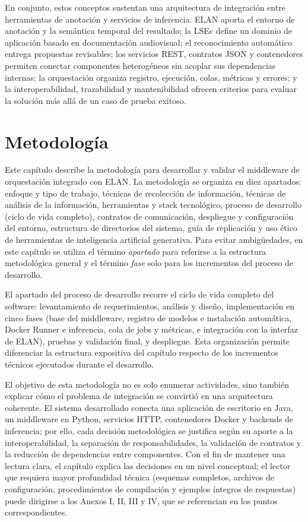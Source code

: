 \documentclass[11pt,a4paper]{article}
\begin{document}
En conjunto, estos conceptos sustentan una arquitectura de integración entre herramientas de anotación y servicios de inferencia. ELAN aporta el entorno de anotación y la semántica temporal del resultado; la LSEc define un dominio de aplicación basado en documentación audiovisual; el reconocimiento automático entrega propuestas revisables; los servicios REST, contratos JSON y contenedores permiten conectar componentes heterogéneos sin acoplar sus dependencias internas; la orquestación organiza registro, ejecución, colas, métricas y errores; y la interoperabilidad, trazabilidad y mantenibilidad ofrecen criterios para evaluar la solución más allá de un caso de prueba exitoso.
\vspace{1\baselineskip}

\section[METODOLOGÍA]{Metodología}

Este capítulo describe la metodología para desarrollar y validar el middleware de orquestación integrado con ELAN. La metodología se organiza en diez apartados: enfoque y tipo de trabajo, técnicas de recolección de información, técnicas de análisis de la información, herramientas y stack tecnológico, proceso de desarrollo (ciclo de vida completo), contratos de comunicación, despliegue y configuración del entorno, estructura de directorios del sistema, guía de replicación y uso ético de herramientas de inteligencia artificial generativa. Para evitar ambigüedades, en este capítulo se utiliza el término \textit{apartado} para referirse a la estructura metodológica general y el término \textit{fase} solo para los incrementos del proceso de desarrollo.

El apartado del proceso de desarrollo recorre el ciclo de vida completo del software: levantamiento de requerimientos, análisis y diseño, implementación en cinco fases (base del middleware, registro de modelos e instalación automática, Docker Runner e inferencia, cola de jobs y métricas, e integración con la interfaz de ELAN), pruebas y validación final, y despliegue. Esta organización permite diferenciar la estructura expositiva del capítulo respecto de los incrementos técnicos ejecutados durante el desarrollo.

El objetivo de esta metodología no es solo enumerar actividades, sino también explicar cómo el problema de integración se convirtió en una arquitectura coherente. El sistema desarrollado conecta una aplicación de escritorio en Java, un middleware en Python, servicios HTTP, contenedores Docker y backends de inferencia; por ello, cada decisión metodológica se justifica según su aporte a la interoperabilidad, la separación de responsabilidades, la validación de contratos y la reducción de dependencias entre componentes. Con el fin de mantener una lectura clara, el capítulo explica las decisiones en un nivel conceptual; el lector que requiera mayor profundidad técnica (esquemas completos, archivos de configuración, procedimientos de compilación y ejemplos íntegros de respuestas) puede dirigirse a los Anexos I, II, III y IV, que se referencian en los puntos correspondientes.
\end{document}
